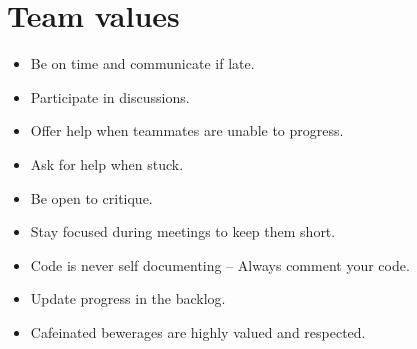 \section{Team values}
\begin{itemize}
  \item Be on time and communicate if late.
  \item Participate in discussions.
  \item Offer help when teammates are unable to progress.
  \item Ask for help when stuck.
  \item Be open to critique.
  \item Stay focused during meetings to keep them short.
  \item Code is never self documenting -- Always comment your code.
  \item Update progress in the backlog.
  \item Cafeinated bewerages are highly valued and respected.
\end{itemize}